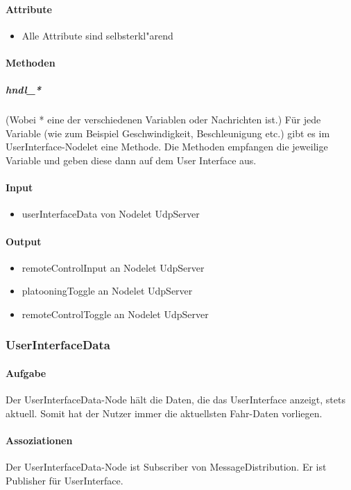 \documentclass[a4paper, 12pt, titlepage]{scrartcl}
\begin{document}
				\paragraph{Attribute}
					\begin{itemize}
					    \item Alle Attribute sind selbsterkl"arend
					\end{itemize}
				\paragraph{Methoden}
					\subparagraph{hndl\_*} (Wobei * eine der verschiedenen Variablen oder Nachrichten ist.) Für jede Variable (wie zum Beispiel Geschwindigkeit, Beschleunigung etc.) gibt es im UserInterface-Nodelet eine Methode. Die Methoden empfangen die jeweilige Variable und geben diese dann auf dem User Interface aus.
				\paragraph{Input}
				    \begin{itemize}
				        \item userInterfaceData von Nodelet UdpServer
				    \end{itemize}
				\paragraph{Output}
				    \begin{itemize}
				        \item remoteControlInput an Nodelet UdpServer
				        \item platooningToggle an Nodelet UdpServer
				        \item remoteControlToggle an Nodelet UdpServer
				    \end{itemize}
				    
			\subsubsection{UserInterfaceData}
			\label{user_interface_data}
				\paragraph{Aufgabe} Der UserInterfaceData-Node hält die Daten, die das UserInterface anzeigt, stets aktuell. Somit hat der Nutzer immer die aktuellsten Fahr-Daten vorliegen. 
				\paragraph{Assoziationen} Der UserInterfaceData-Node ist Subscriber von MessageDistribution. Er ist Publisher für UserInterface. 
\end{document}

